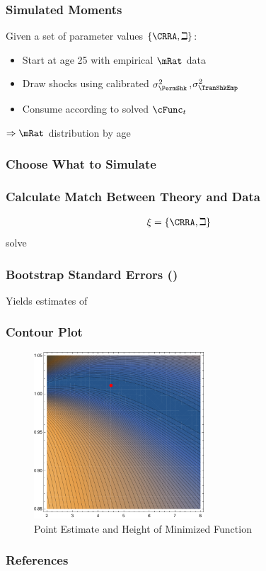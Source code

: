 \documentclass{beamer}
\begin{document}
\begin{frame}
\frametitle{Simulated Moments}

Given a set of parameter values $\{\CRRA,\beth\}$:
\begin{itemize}
\item Start at age 25 with empirical $\mRat$ data
\item Draw shocks using calibrated $\sigma^{2}_{\PermShk}$,$\sigma^{2}_{\TranShkEmp}$
\item Consume according to solved $\cFunc_{t}$
\end{itemize}
\pause 
$\Rightarrow \mRat$ distribution by age
\end{frame}

\begin{frame}
\frametitle{Choose What to Simulate}

\end{frame}

\begin{frame}
\frametitle{Calculate Match Between Theory and Data}
\begin{equation}\begin{gathered}\begin{aligned}
\xi  & = \{\CRRA,\beth\}
\end{aligned}\end{gathered}\end{equation}
solve


\end{frame}
\begin{frame}
\frametitle{Bootstrap Standard Errors (\cite{horowitzBootstrap})}

Yields estimates of 


\end{frame}

\begin{frame}
\frametitle{Contour Plot}
\begin{figure}
     \includegraphics[width=2.5in]{./Figures/PlotContourMedianStrEst.pdf}
    \caption{Point Estimate and Height of Minimized Function}
    \label{fig:PlotContourMedianStrEst}
\end{figure}

\end{frame}

\beamerdefaultoverlayspecification{<*>}

\begin{frame}[allowframebreaks]
\frametitle{\textbf{References}}
\tiny

\end{frame}
\end{document}
